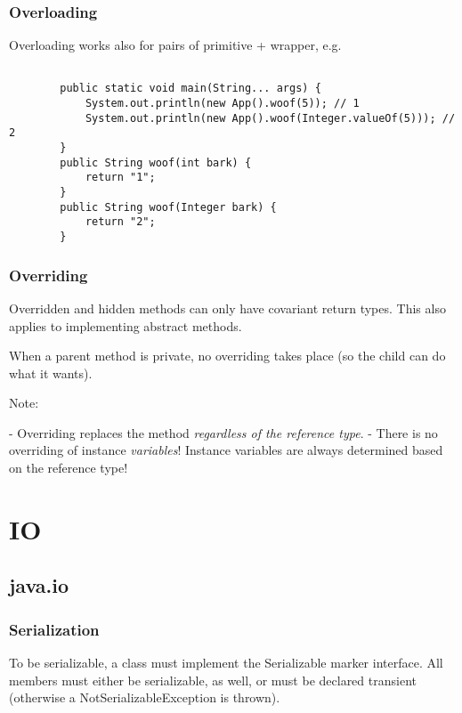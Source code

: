 \documentclass{scrartcl}
\begin{document}
\subsubsection{Overloading}

    Overloading works also for pairs of primitive + wrapper, e.g.

    \begin{lstlisting}

        public static void main(String... args) {
            System.out.println(new App().woof(5)); // 1
            System.out.println(new App().woof(Integer.valueOf(5))); // 2
        }
        public String woof(int bark) {
            return "1";
        }
        public String woof(Integer bark) {
            return "2";
        }
    \end{lstlisting}



\subsubsection{Overriding}

    Overridden and hidden methods can only have covariant return types.
    This also applies to implementing abstract methods.

    When a parent method is private, no overriding takes place (so the child can do what it wants).

    Note:

    - Overriding replaces the method \textit{regardless of the reference type}.
    - There is no overriding of instance \textit{variables}! Instance variables are always determined based on the reference type!

\section{IO}
\subsection{java.io}
\subsubsection{Serialization}

    To be serializable, a class must implement the Serializable marker interface.
    All members must either be serializable, as well, or must be declared transient (otherwise
    a NotSerializableException is thrown).
\end{document}
